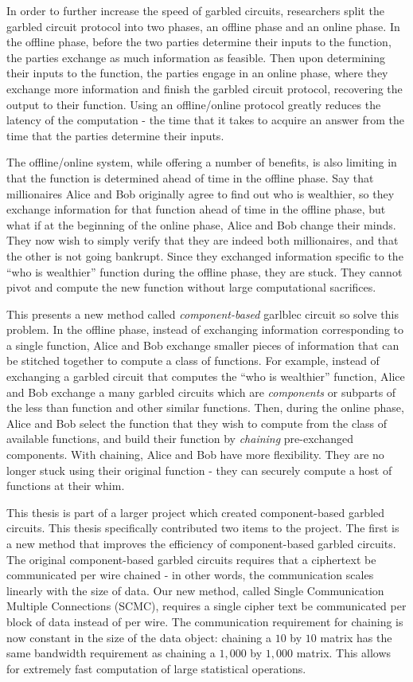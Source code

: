 In order to further increase the speed of garbled circuits, researchers split the garbled circuit protocol into two phases, an offline phase and an online phase.
In the offline phase, before the two parties determine their inputs to the function, the parties exchange as much information as feasible. 
Then upon determining their inputs to the function, the parties engage in an online phase, where they exchange more information and finish the garbled circuit protocol, recovering the output to their function.
Using an offline/online protocol greatly reduces the latency of the computation - the time that it takes to acquire an answer from the time that the parties determine their inputs.

The offline/online system, while offering a number of benefits, is also limiting in that the function is determined ahead of time in the offline phase.
Say that millionaires Alice and Bob originally agree to find out who is wealthier, so they exchange information for that function ahead of time in the offline phase, but what if at the beginning of the online phase, Alice and Bob change their minds. 
They now wish to simply verify that they are indeed both millionaires, and that the other is not going bankrupt.
Since they exchanged information specific to the ``who is wealthier'' function during the offline phase, they are stuck. 
They cannot pivot and compute the new function without large computational sacrifices.

This presents a new method called \textit{component-based} garlblec circuit so solve this problem.
In the offline phase, instead of exchanging information corresponding to a single function, Alice and Bob exchange smaller pieces of information that can be stitched together to compute a class of functions.
For example, instead of exchanging a garbled circuit that computes the ``who is wealthier'' function, Alice and Bob exchange a many garbled circuits which are \textit{components} or subparts of the less than function and other similar functions.
Then, during the online phase, Alice and Bob select the function that they wish to compute from the class of available functions, and build their function by \textit{chaining} pre-exchanged components.
With chaining, Alice and Bob have more flexibility. 
They are no longer stuck using their original function - they can securely compute a host of functions at their whim. 

This thesis is part of a larger project which created component-based garbled circuits.
This thesis specifically contributed two items to the project.
The first is a new method that improves the efficiency of component-based garbled circuits. 
The original component-based garbled circuits requires that a ciphertext be communicated per wire chained - in other words, the communication scales linearly with the size of data.
Our new method, called Single Communication Multiple Connections (SCMC), requires a single cipher text be communicated per block of data instead of per wire. 
The communication requirement for chaining is now constant in the size of the data object: chaining a $10$ by $10$ matrix has the same bandwidth requirement as chaining a $1,000$ by $1,000$ matrix. 
This allows for extremely fast computation of large statistical operations. 

